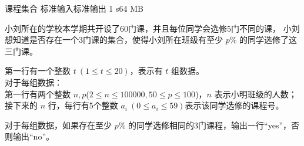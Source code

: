 \gdef\thisproblemauthor{maopao}
\begin{problem}{课程集合}
{标准输入}{标准输出}
{1 s}{64 MB}{}

小刘所在的学校本学期共开设了60门课，并且每位同学会选修5门不同的课，
小刘想知道是否存在一个3门课的集合，使得小刘所在班级有至少 $p\%$ 的同学选修了这三门课。

\InputFile

第一行有一个整数 $t\ (1 \leq t \leq 20)$，表示有 $t$ 组数据。\\
对于每组数据：\\
第一行有两个整数 $n,p$($2 \leq n \leq 100000 , 50\leq p \leq 100$)，$n$ 表示小明班级的人数；\\
接下来的 $n$ 行，每行有5个整数 $a_i\ (0\leq a_i \leq 59)$表示该同学选修的课程号。

\OutputFile

对于每组数据，如果存在至少 $p\%$ 的同学选修相同的3门课程，输出一行``yes''，否则输出``no''。

\Example

\begin{example}
%
\end{example}

\end{problem}
